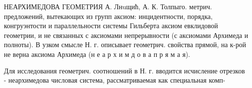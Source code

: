 \documentclass[10pt]{article}
\begin{document}
НЕАРХИМЕДОВА ГЕОМЕТРИЯ А. Лнuщић, А. К. Толпыго. метрич. предложений, вытекающих из групп аксиом: инцидентности, порядка, конгруэнтости и параллельности системы Гильберта аксиом евклидовой геометрии, и не связанных с аксиомами непрерывности (с аксиомами Архимеда и полноты). В узком смысле Н. г. описывает геометрич. свойства прямой, на к-рой не верна аксиома Архимеда (н е а р х и м д о в а п р я м а я).



Для исследования геометрич. соотношений в Н. г. вводится исчисление отрезков - неархимедова числовая система, рассматриваемая как специальная комп-
\end{document}
